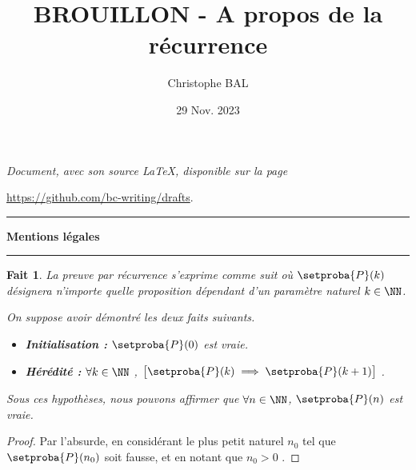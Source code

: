 \documentclass[12pt]{amsart}
\newtheorem{fact}{Fait}[section]
\begin{document}
\title{BROUILLON - A propos de la récurrence}
\author{Christophe BAL}
\date{29 Nov. 2023}

\maketitle

\begin{center}
	\itshape
	Document, avec son source \LaTeX, disponible sur la page

	\url{https://github.com/bc-writing/drafts}.
\end{center}


\bigskip


\begin{center}
	\hrule\vspace{.3em}
	{
		\fontsize{1.35em}{1em}\selectfont
		\textbf{Mentions \og légales \fg}
	}

	\vspace{0.45em}
	\doclicenseThis
	\hrule
\end{center}


\bigskip




\begin{fact} \label{recursivity}
	La preuve par récurrence s'exprime comme suit où $\setproba{P}(k)$ désignera n'importe quelle proposition dépendant d'un paramètre naturel $k \in \NN$.

	\medskip

	On suppose avoir démontré les deux faits suivants.
	
	\begin{itemize}[label=\small\textbullet]
		\item \textbf{Initialisation :}
		      $\setproba{P}(0)$ est vraie.

		\item \textbf{Hérédité :}
		      $\forall k \in \NN$ , $\big[ \setproba{P}(k) \implies \setproba{P}(k+1) \big]$ .
	\end{itemize}

	Sous ces hypothèses, nous pouvons affirmer que $\forall n \in \NN$, $\setproba{P}(n)$ est vraie.
\end{fact}


\begin{proof}
	Par l'absurde, en considérant le plus petit naturel $n_0$ tel que $\setproba{P}(n_0)$ soit fausse, et en notant que $n_0 > 0$ . 
\end{proof}
\end{document}
